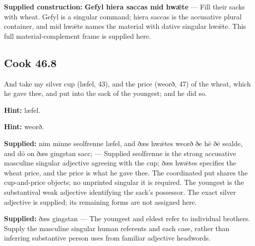 \textbf{Supplied construction:} \textbf{Gefyl hiera saccas mid hwǣte} — Fill their sacks with wheat. Gefyl is a singular command; hiera saccas is the accusative plural container, and mid hwǣte names the material with dative singular hwǣte. This full material-complement frame is supplied here.

\par\begin{minipage}{\linewidth}\raggedright
\subsection*{Cook 46.8}

And take my silver cup (læfel, 43), and the price (weorð, 47) of the wheat, which he gave thee, and put into the sack of the youngest; and he did so.

\textbf{Hint:} læfel.

\textbf{Hint:} weorð.

\end{minipage}\par\addvspace{4pt}

\textbf{Supplied:} nim mīnne seolfrenne læfel, and ðæs hwǣtes weorð ðe hē ðē sealde, and dō on ðæs gingstan sacc; — Supplied seolfrenne is the strong accusative masculine singular adjective agreeing with the cup; ðæs hwǣtes specifies the wheat price, and the price is what he gave thee. The coordinated put shares the cup-and-price objects; no unprinted singular it is required. The youngest is the substantival weak adjective identifying the sack’s possessor. The exact silver adjective is supplied; its remaining forms are not assigned here.

\textbf{Supplied:} ðæs gingstan — The youngest and eldest refer to individual brothers. Supply the masculine singular human referents and each case, rather than inferring substantive person uses from familiar adjective headwords.

